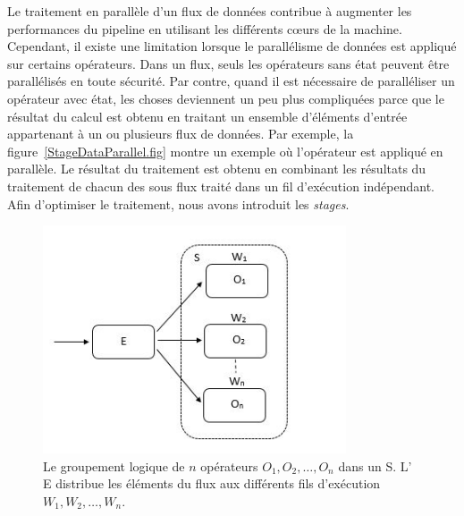 Le traitement en parall\`ele d'un flux de donn\'ees contribue \`a augmenter les performances du pipeline en utilisant les diff\'erents cœurs de la machine. Cependant, il existe une limitation lorsque le parall\'elisme de donn\'ees est appliqu\'e sur certains op\'erateurs. Dans un flux, seuls les op\'erateurs sans \'etat peuvent \^etre parall\'elis\'es en toute s\'ecurit\'e. Par contre, quand il est n\'ecessaire de parall\'eliser un op\'erateur avec \'etat, les choses deviennent un peu plus compliqu\'ees parce que le r\'esultat du calcul est obtenu en traitant un ensemble d'\'el\'ements d'entrée appartenant \`a un ou plusieurs flux de donn\'ees. Par exemple, la figure~\ref{StageDataParallel.fig} montre un exemple o\`u l'op\'erateur  est appliqu\'e en parall\`ele. Le r\'esultat du traitement est obtenu en combinant les r\'esultats du traitement de chacun des sous flux trait\'e dans un fil d'ex\'ecution ind\'ependant. Afin d'optimiser le traitement, nous avons introduit les \emph{stages}.


\begin{figure}[ht]
\centering
     \includegraphics[width=0.8\textwidth]{Figures/Stages.jpg}
      \caption[Le groupement logique de $n$ op\'erateurs $O_1, O_2, \ldots, O_n$ dans un  S.]{Le groupement logique de $n$ op\'erateurs $O_1, O_2, \ldots, O_n$ dans un  S.  L' E distribue les \'el\'ements du flux aux diff\'erents fils d'ex\'ecution $W_1, W_2, \ldots, W_n$.}
       \label{Stages.fig}
\end{figure}

